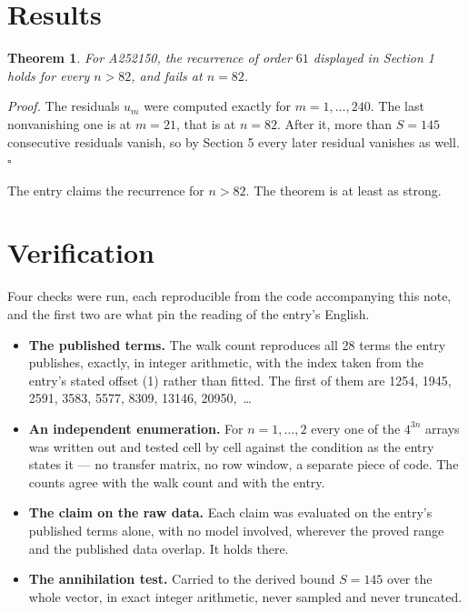 \documentclass[11pt]{article}
\newtheorem{theorem}{Theorem}
\theoremstyle{definition}
\begin{document}
\section{Results}

\begin{theorem} For A252150, the recurrence of order $61$ displayed in Section 1 holds for every $n > 82$, and fails at $n = 82$.\end{theorem}

{\itshape Proof.} The residuals $u_m$ were computed exactly for $m = 1,\dots,240$. The last nonvanishing one is at $m = 21$, that is at $n = 82$. After it, more than $S = 145$ consecutive residuals vanish, so by Section 5 every later residual vanishes as well. $\square$

The entry claims the recurrence for $n > 82$. The theorem is at least as strong.

\section{Verification}

Four checks were run, each reproducible from the code accompanying this note, and the first two are what pin the reading of the entry's English.

\begin{itemize}

\item {\bfseries The published terms.} The walk count reproduces all 28 terms the entry publishes, exactly, in integer arithmetic, with the index taken from the entry's stated offset (1) rather than fitted. The first of them are 1254, 1945, 2591, 3583, 5577, 8309, 13146, 20950,~\dots

\item {\bfseries An independent enumeration.} For $n = 1,\dots,2$ every one of the $4^{3n}$ arrays was written out and tested cell by cell against the condition as the entry states it --- no transfer matrix, no row window, a separate piece of code. The counts agree with the walk count and with the entry.

\item {\bfseries The claim on the raw data.} Each claim was evaluated on the entry's published terms alone, with no model involved, wherever the proved range and the published data overlap. It holds there.

\item {\bfseries The annihilation test.} Carried to the derived bound $S = 145$ over the whole vector, in exact integer arithmetic, never sampled and never truncated.

\end{itemize}
\end{document}
